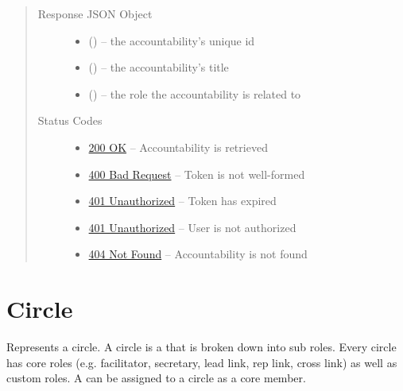 \documentclass[letterpaper,10pt,english]{sphinxmanual}
\begin{document}
\begin{fulllineitems}
\begin{quote}
\begin{description}
\begin{itemize}
\end{itemize}

\item[{Response JSON Object}] \leavevmode\begin{itemize}
\item {} 
 () -- the accountability's unique id

\item {} 
 () -- the accountability's title

\item {} 
 () -- the role the accountability is related to

\end{itemize}

\item[{Status Codes}] \leavevmode\begin{itemize}
\item {} 
\href{http://www.w3.org/Protocols/rfc2616/rfc2616-sec10.html\#sec10.2.1}{200 OK} -- Accountability is retrieved

\item {} 
\href{http://www.w3.org/Protocols/rfc2616/rfc2616-sec10.html\#sec10.4.1}{400 Bad Request} -- Token is not well-formed

\item {} 
\href{http://www.w3.org/Protocols/rfc2616/rfc2616-sec10.html\#sec10.4.2}{401 Unauthorized} -- Token has expired

\item {} 
\href{http://www.w3.org/Protocols/rfc2616/rfc2616-sec10.html\#sec10.4.2}{401 Unauthorized} -- User is not authorized

\item {} 
\href{http://www.w3.org/Protocols/rfc2616/rfc2616-sec10.html\#sec10.4.5}{404 Not Found} -- Accountability is not found

\end{itemize}

\end{description}\end{quote}

\end{fulllineitems}



\section{Circle}
\label{\detokenize{resources/circle::doc}}\label{\detokenize{resources/circle:id1}}\label{\detokenize{resources/circle:circle}}
Represents a circle. A circle is a {\hyperref[\detokenize{resources/role:role}]{}} that is broken down into sub roles. Every circle has core roles (e.g. facilitator, secretary, lead link, rep link, cross link) as well as custom roles. A {\hyperref[\detokenize{resources/partner:partner}]{}} can be assigned to a circle as a core member.
\end{document}
